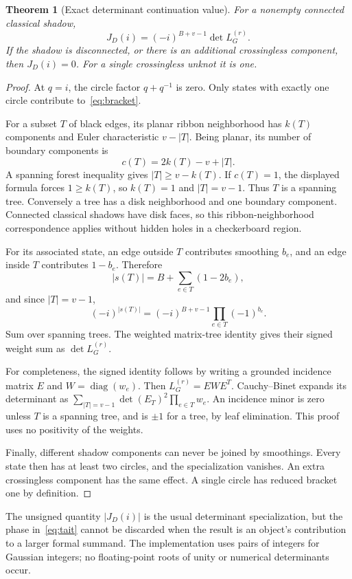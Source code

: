 \documentclass[11pt]{article}
\newtheorem{theorem}{Theorem}[section]
\theoremstyle{definition}
\theoremstyle{remark}
\begin{document}
\begin{theorem}[Exact determinant continuation value]\label{thm:tait}
For a nonempty connected classical shadow,
\begin{equation}\label{eq:tait}
 J_D(i)=(-i)^{B+v-1}\det L_G^{(r)}.
\end{equation}
If the shadow is disconnected, or there is an additional crossingless
component, then $J_D(i)=0$. For a single crossingless unknot it is one.
\end{theorem}
\begin{proof}
At $q=i$, the circle factor $q+q^{-1}$ is zero. Only states with exactly one
circle contribute to~\eqref{eq:bracket}.

For a subset $T$ of black edges, its planar ribbon neighborhood has
$k(T)$ components and Euler characteristic $v-|T|$. Being planar, its number
of boundary components is
\[
 c(T)=2k(T)-v+|T|.
\]
A spanning forest inequality gives $|T|\ge v-k(T)$. If $c(T)=1$, the displayed
formula forces $1\ge k(T)$, so $k(T)=1$ and $|T|=v-1$. Thus $T$ is a spanning
tree. Conversely a tree has a disk neighborhood and one boundary component.
Connected classical shadows have disk faces, so this ribbon-neighborhood
correspondence applies without hidden holes in a checkerboard region.

For its associated state, an edge outside $T$ contributes smoothing $b_e$,
and an edge inside $T$ contributes $1-b_e$. Therefore
\[
 |s(T)|=B+\sum_{e\in T}(1-2b_e),
\]
and since $|T|=v-1$,
\[
 (-i)^{|s(T)|}=(-i)^{B+v-1}\prod_{e\in T}(-1)^{b_e}.
\]
Sum over spanning trees. The weighted matrix-tree identity gives their
signed weight sum as $\det L_G^{(r)}$.

For completeness, the signed identity follows by writing a grounded
incidence matrix $E$ and $W=\operatorname{diag}(w_e)$. Then
$L_G^{(r)}=EWE^T$. Cauchy--Binet expands its determinant as
$\sum_{|T|=v-1}\det(E_T)^2\prod_{e\in T}w_e$.
An incidence minor is zero unless $T$ is a spanning tree, and is $\pm1$ for
a tree, by leaf elimination. This proof uses no positivity of the weights.

Finally, different shadow components can never be joined by smoothings.
Every state then has at least two circles, and the specialization vanishes.
An extra crossingless component has the same effect. A single circle has
reduced bracket one by definition.
\end{proof}

The unsigned quantity $|J_D(i)|$ is the usual determinant specialization,
but the phase in~\eqref{eq:tait} cannot be discarded when the result is an
object's contribution to a larger formal summand. The implementation uses
pairs of integers for Gaussian integers; no floating-point roots of unity
or numerical determinants occur.
\end{document}
